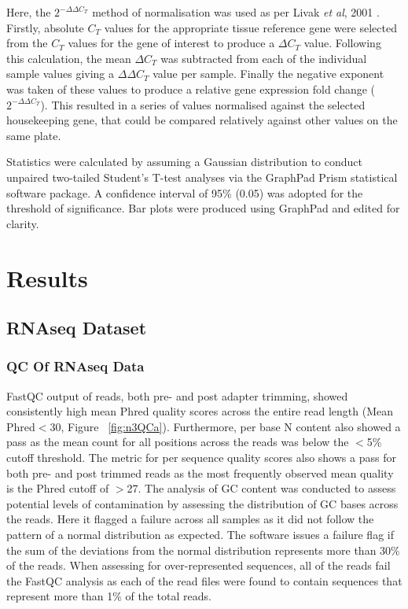 Here, the $2^{-\Delta\Delta C_{T}}$ method of normalisation was used as per Livak \textit{et al}, 2001 \cite{Livak2001}. Firstly, absolute $C_{T}$ values for the appropriate tissue reference gene were selected from the $C_{T}$ values for the gene of interest to produce a $\Delta C_{T}$ value. Following this calculation, the mean $\Delta C_{T}$ was subtracted from each of the individual sample values giving a $\Delta\Delta C_{T}$ value per sample. Finally the negative exponent was taken of these values to produce a relative gene expression fold change ($2^{-\Delta\Delta C_{T}}$). This resulted in a series of values normalised against the selected housekeeping gene, that could be compared relatively against other values on the same plate. 

Statistics were calculated by assuming a Gaussian distribution to conduct unpaired two-tailed Student’s T-test analyses via the GraphPad Prism statistical software package. A confidence interval of 95\% (0.05) was adopted for the threshold of significance.  Bar plots were produced using GraphPad and edited for clarity. 

\section{Results}
\subsection{RNAseq Dataset}
\subsubsection{QC Of RNAseq Data}

FastQC output of reads, both pre- and post adapter trimming, showed consistently high mean Phred quality scores across the entire read length (Mean Phred$<$30, Figure ~\ref{fig:n3QCa}). Furthermore, per base N content also showed a pass as the mean count for all positions across the reads was below the $<$5\% cutoff threshold. The metric for per sequence quality scores also shows a pass for both pre- and post trimmed reads as the most frequently observed mean quality is the Phred cutoff of $>$27. The analysis of GC content was conducted to assess potential levels of contamination by assessing the distribution of GC bases across the reads. Here it flagged a failure across all samples as it did not follow the pattern of a normal distribution as expected. The software issues a failure flag if the sum of the deviations from the normal distribution represents more than 30\% of the reads. When assessing for over-represented sequences, all of the reads fail the FastQC analysis as each of the read files were found to contain sequences that represent more than 1\% of the total reads. \\

